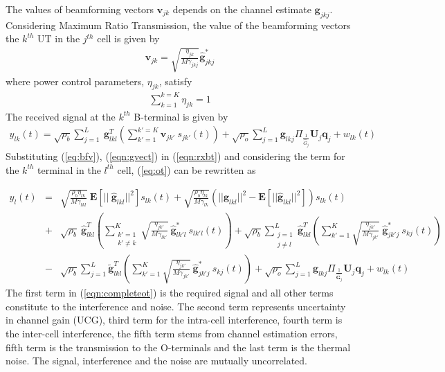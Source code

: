 \documentclass[10pt, a4paper, twoside,fleqn]{article}
\begin{document}
The values of beamforming vectors $\pmb{v}_{jk}$ depends on the channel estimate $\pmb{g}_{jkj}$. Considering Maximum Ratio Transmission, the value of the beamforming vectors the $k^{th}$ UT in the $j^{th}$ cell is given by
\begin{eqnarray}\label{eq:bfv}
	\pmb{v}_{jk} = \sqrt{\frac{\eta_{jk}}{M\gamma_{jkj}}}\pmb{\hat g}^*_{jkj}
\end{eqnarray}
where power control parameters, $\eta_{jk}$, satisfy 
\begin{eqnarray}
\sum\limits_{k=1}^{k=K}\eta_{jk}=1
\end{eqnarray}
The received signal at the $k^{th}$ B-terminal is given by
\begin{eqnarray}\label{eqn:rxbt}
    y_{lk}(t) = \sqrt{\rho_b}\sum\limits_{j=1}^{L} \ \pmb{g}_{lkl}^T \left( \sum\limits_{k'=1}^{k'=K}\pmb{v}_{jk'} \ s_{jk'}(t)\right) + \sqrt{\rho_o}\sum_{j=1}^{L}\pmb{g}_{lkj} \Pi_{\frac{1}{\hat G_j}} \pmb{U}_j \pmb{q}_{j}
    + w_{lk}(t) 
\end{eqnarray}
Substituting (\ref{eq:bfv}), (\ref{eqn:gvect}) in (\ref{eqn:rxbt}) and considering the term for the $k^{th}$ terminal in the $l^{th}$ cell, (\ref{eq:ot}) can be rewritten as

\begin{eqnarray} \label{eqn:completeot}
	y_{l}(t)  &=& \sqrt{\frac{\rho_b\eta_{lk}}{M\gamma_{lkl}}} \ \pmb{E}[|| \ \pmb{\hat g}_{lkl}||^2]s_{lk}(t)
	           +  \sqrt{\frac{\rho_b\eta_{lk}}{M\gamma_{lk}}}\left(||\pmb{\hat g}_{lkl}||^2 - \pmb{E}[||\pmb{\hat g}_{lkl}||^2]\right)s_{lk}(t) \nonumber \\    
               &+& \sqrt{\rho_b} \ \pmb{\hat g}_{lkl}^T \left(\sum_{\substack{k'=1 \\ k' \neq k}}^{K} \sqrt{\frac{\eta_{jk'}}{M\gamma_{lk'}}} \ \pmb{\hat g}^*_{lk'l} \ s_{lk'l} (t)\right) 
               + \sqrt{\rho_b} \sum_{\substack{j=1 \\ j \neq l}}^{L} \pmb{\hat g}_{lkl}^T \left(\sum_{k'=1}^{K} \sqrt{\frac{\eta_{jk'}}{M\gamma_{jk'}}} \ \pmb{\hat g}^*_{jk'j} \ s_{kj} (t)\right)\nonumber \\
               &-& \sqrt{\rho_b} \sum_{j=1}^{L} \pmb{\widetilde{g}}_{lkl}^T \left(\sum_{k'=1}^{K} \sqrt{\frac{\eta_{jk'}}{M\gamma_{jk'}}} \ \pmb{\hat g}^*_{jk'j} \ s_{kj} (t)\right) 
               + \sqrt{\rho_o}\sum_{j=1}^{L}\pmb{g}_{lkj} \Pi_{\frac{1}{\pmb{\hat G}_j}} \pmb{U}_j \pmb{q}_{j}
               + w_{lk}(t)      
\end{eqnarray}
The first term in (\ref{eqn:completeot}) is the required signal and all other terms constitute to the interference and noise. The second term represents uncertainty in channel gain (UCG), third term for the intra-cell interference, fourth term is the inter-cell interference, the fifth term stems from channel estimation errors, fifth term is the transmission to the O-terminals and the last term is the thermal noise. The signal, interference and the noise are mutually uncorrelated.
\end{document}

